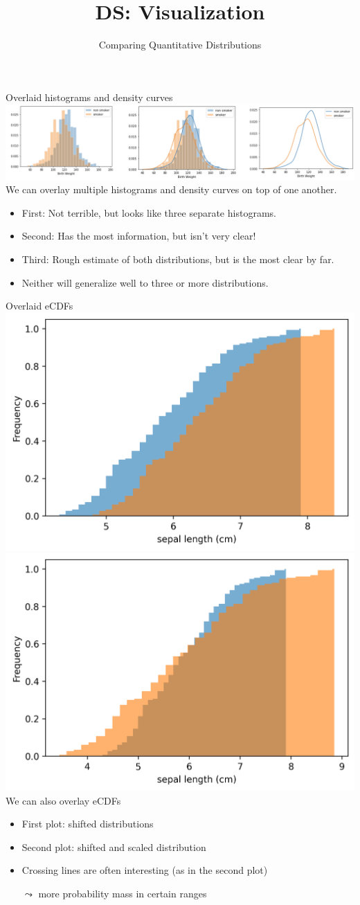 \documentclass[aspectratio=169]{../latex_main/tntbeamer}  %
\title[Visualization]{DS: Visualization}
\subtitle{Comparing Quantitative Distributions}
\begin{document}
	
	\maketitle
	\begin{frame}{Overlaid histograms and density curves}
	    \includegraphics[scale=.35]{Bild42}\\
	    We can overlay multiple histograms and density curves on top of one another.
	    \begin{itemize}
	        \item First: Not terrible, but looks like three separate histograms.
	        \item Second: Has the most information, but isn’t very clear!
	        \item Third: Rough estimate of both distributions, but is the most clear by far.
	        \item Neither will generalize well to three or more distributions.
	    \end{itemize}
    \end{frame}
    
    \begin{frame}{Overlaid eCDFs}
        \includegraphics[width=.45\textwidth]{./figure/cdf_iris_sepal_length_shifted.png}
	    \includegraphics[width=.45\textwidth]{./figure/cdf_iris_sepal_length_shifted_scaled.png}\\
	    
	    We can also overlay eCDFs
	    \begin{itemize}
	        \item First plot: shifted distributions
	        \item Second plot: shifted and scaled distribution
	        \item Crossing lines are often interesting (as in the second plot)
	        \item[$\leadsto$] more probability mass in certain ranges
	    \end{itemize}
    \end{frame}
	
\end{document}
